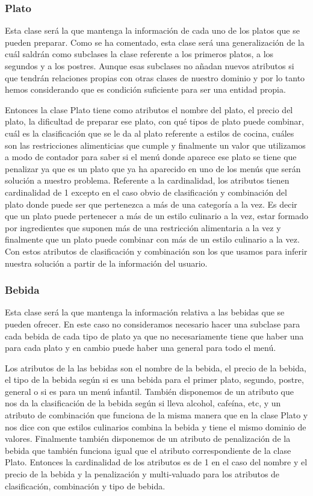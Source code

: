 \documentclass{article}
\begin{document}
\subsubsection{Plato}
Esta clase será la que mantenga la información de cada uno de los platos que se pueden preparar. Como se ha comentado, esta clase será una generalización de la cuál saldrán como subclases la clase referente a los primeros platos, a los segundos y a los postres. Aunque esas subclases no añadan nuevos atributos si que tendrán relaciones propias con otras clases de nuestro dominio y por lo tanto hemos considerando que es condición suficiente para ser una entidad propia.
\par
Entonces la clase Plato tiene como atributos el nombre del plato, el precio del plato, la dificultad de preparar ese plato, con qué tipos de plato puede combinar, cuál es la clasificación que se le da al plato referente a estilos de cocina, cuáles son las restricciones alimenticias que cumple y finalmente un valor que utilizamos a modo de contador para saber si el menú donde aparece ese plato se tiene que penalizar ya que es un plato que ya ha aparecido en uno de los menús que serán solución a nuestro problema.
Referente a la cardinalidad, los atributos tienen cardinalidad de 1 excepto en el caso obvio de clasificación y combinación del plato donde puede ser que pertenezca a más de una categoría a la vez. Es decir que un plato puede pertenecer a más de un estilo culinario a la vez, estar formado por ingredientes que suponen más de una restricción alimentaria a la vez y finalmente que un plato puede combinar con más de un estilo culinario a la vez. Con estos atributos de clasificación y combinación son los que usamos para inferir nuestra solución a partir de la información del usuario.
\subsubsection{Bebida}
Esta clase será la que mantenga la información relativa a las bebidas que se pueden ofrecer. En este caso no consideramos necesario hacer una subclase para cada bebida de cada tipo de plato ya que no necesariamente tiene que haber una para cada plato y en cambio puede haber una general para todo el menú.
\par
Los atributos de la las bebidas son el nombre de la bebida, el precio de la bebida, el tipo de la bebida según si es una bebida para el primer plato, segundo, postre, general o si es para un menú infantil. También disponemos de un atributo que nos da la clasificación de la bebida según si lleva alcohol, cafeína, etc, y un atributo de combinación que funciona de la misma manera que en la clase Plato y nos dice con que estilos culinarios combina la bebida y tiene el mismo dominio de valores. Finalmente también disponemos de un atributo de penalización de la bebida que también funciona igual que el atributo correspondiente de la clase Plato.
Entonces la cardinalidad de los atributos es de 1 en el caso del nombre y el precio de la bebida y la penalización y multi-valuado para los atributos de clasificación, combinación y tipo de bebida.
\end{document}
